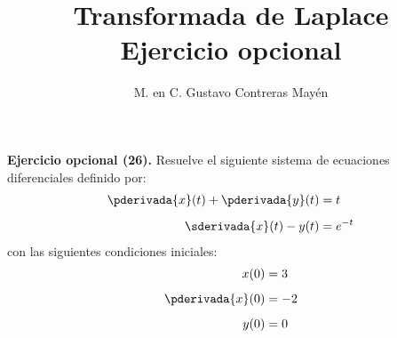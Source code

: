 
\title{Transformada de Laplace \\[0.3em]  \large{Ejercicio opcional} \vspace{-3ex}}
\author{M. en C. Gustavo Contreras Mayén}
\date{ }


\vspace{-4cm}
\maketitle
\fontsize{14}{14}\selectfont

\noindent
\textbf{Ejercicio opcional (26).} Resuelve el siguiente sistema de ecuaciones diferenciales definido por:
\begin{align*}
\pderivada{x} (t) + \pderivada{y} (t) &= t \\[0.5em]
\sderivada{x} (t) - y (t) &= e^{-t}
\end{align*}
con las siguientes condiciones iniciales:
\begin{align*}
x (0) &= 3 \\[0.5em]
\pderivada{x} (0) &= -2 \\[0.5em]
y (0) &= 0
\end{align*}
